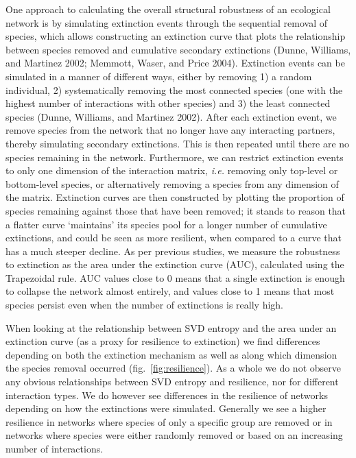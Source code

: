 \documentclass[11pt]{article}
\begin{document}
One approach to calculating the overall structural robustness of an
ecological network is by simulating extinction events through the
sequential removal of species, which allows constructing an extinction
curve that plots the relationship between species removed and cumulative
secondary extinctions (Dunne, Williams, and Martinez 2002; Memmott,
Waser, and Price 2004). Extinction events can be simulated in a manner
of different ways, either by removing 1) a random individual, 2)
systematically removing the most connected species (one with the highest
number of interactions with other species) and 3) the least connected
species (Dunne, Williams, and Martinez 2002). After each extinction
event, we remove species from the network that no longer have any
interacting partners, thereby simulating secondary extinctions. This is
then repeated until there are no species remaining in the network.
Furthermore, we can restrict extinction events to only one dimension of
the interaction matrix, \emph{i.e.} removing only top-level or
bottom-level species, or alternatively removing a species from any
dimension of the matrix. Extinction curves are then constructed by
plotting the proportion of species remaining against those that have
been removed; it stands to reason that a flatter curve `maintains' its
species pool for a longer number of cumulative extinctions, and could be
seen as more resilient, when compared to a curve that has a much steeper
decline. As per previous studies, we measure the robustness to
extinction as the area under the extinction curve (AUC), calculated
using the Trapezoidal rule. AUC values close to 0 means that a single
extinction is enough to collapse the network almost entirely, and values
close to 1 means that most species persist even when the number of
extinctions is really high.

When looking at the relationship between SVD entropy and the area under
an extinction curve (as a proxy for resilience to extinction) we find
differences depending on both the extinction mechanism as well as along
which dimension the species removal occurred
(fig.~\ref{fig:resilience}). As a whole we do not observe any obvious
relationships between SVD entropy and resilience, nor for different
interaction types. We do however see differences in the resilience of
networks depending on how the extinctions were simulated. Generally we
see a higher resilience in networks where species of only a specific
group are removed or in networks where species were either randomly
removed or based on an increasing number of interactions.
\end{document}
